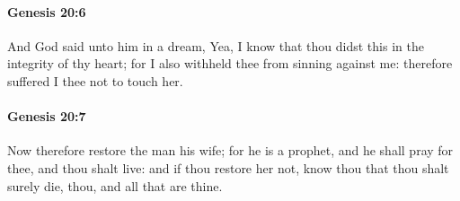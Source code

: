 		\paragraph{Genesis 20:6} %
			\label{GENESIS-20-6}

			And God said unto him in a dream, Yea, I know that thou didst this in the integrity of thy heart; for I also withheld thee from sinning against me: therefore suffered I thee not to touch her.


		\paragraph{Genesis 20:7} %
			\label{GENESIS-20-7}

			Now therefore restore the man his wife; for he is a prophet, and he shall pray for thee, and thou shalt live: and if thou restore her not, know thou that thou shalt surely die, thou, and all that are thine.

